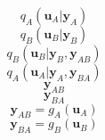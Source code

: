 \documentclass[preview]{standalone}
\begin{document}
\Large
$$q_A(\mathbf{u}_A|\mathbf{y}_A)$$
$$q_B(\mathbf{u}_B|\mathbf{y}_B)$$
$$q_B(\mathbf{u}_B|\mathbf{y}_B, \mathbf{y}_{AB})$$
$$q_A(\mathbf{u}_A|\mathbf{y}_A, \mathbf{y}_{BA})$$
$$\mathbf{y}_{AB}$$
$$\mathbf{y}_{BA}$$
$$\mathbf{y}_{AB}=g_A(\mathbf{u}_A)$$
$$\mathbf{y}_{BA}=g_B(\mathbf{u}_B)$$
\end{document}

